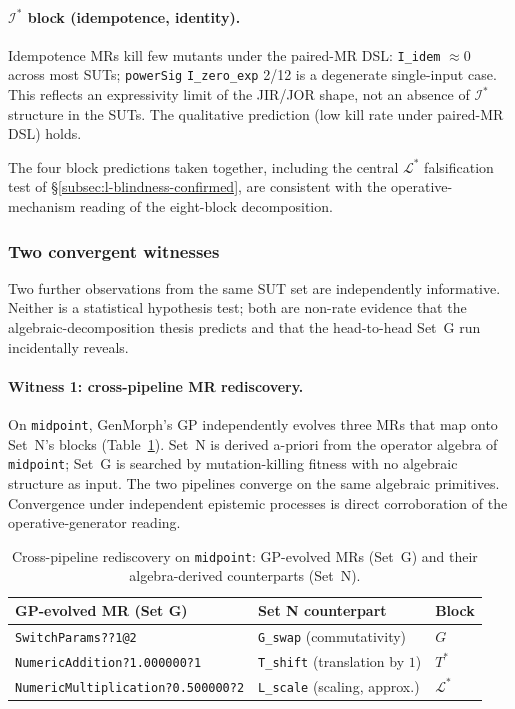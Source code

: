 \documentclass[acmsmall, screen]{acmart}
\begin{document}
\paragraph{$\mathcal{I}^{*}$ block (idempotence, identity).}
Idempotence MRs kill few mutants under the paired-MR DSL:
\texttt{I\_idem} $\approx 0$ across most SUTs; \texttt{powerSig}
\texttt{I\_zero\_exp} 2/12 is a degenerate single-input case. This
reflects an expressivity limit of the JIR/JOR shape, not an absence
of $\mathcal{I}^{*}$ structure in the SUTs. The qualitative
prediction (low kill rate under paired-MR DSL) holds.

The four block predictions taken together, including the central
$\mathcal{L}^{*}$ falsification test of
\S\ref{subsec:l-blindness-confirmed}, are consistent with the
operative-mechanism reading of the eight-block decomposition.

\subsubsection{Two convergent witnesses}
\label{subsec:convergent-witnesses}

Two further observations from the same SUT set are independently
informative. Neither is a statistical hypothesis test; both are
non-rate evidence that the algebraic-decomposition thesis predicts
and that the head-to-head Set~G run incidentally reveals.

\paragraph{Witness 1: cross-pipeline MR rediscovery.}
On \texttt{midpoint}, GenMorph's GP independently evolves three MRs
that map onto Set~N's blocks (Table~\ref{tab:rediscovery}). Set~N is
derived a-priori from the operator algebra of \texttt{midpoint};
Set~G is searched by mutation-killing fitness with no algebraic
structure as input. The two pipelines converge on the same algebraic
primitives. Convergence under independent epistemic processes is
direct corroboration of the operative-generator reading.

\begin{table}[h]
\centering
\caption{Cross-pipeline rediscovery on \texttt{midpoint}: GP-evolved
MRs (Set~G) and their algebra-derived counterparts (Set~N).}
\label{tab:rediscovery}
\small
\begin{tabular}{lll}
\toprule
GP-evolved MR (Set G) & Set N counterpart & Block \\
\midrule
\texttt{SwitchParams??1@2}                & \texttt{G\_swap} (commutativity)         & $G$ \\
\texttt{NumericAddition?1.000000?1}       & \texttt{T\_shift} (translation by $1$)   & $T^{*}$ \\
\texttt{NumericMultiplication?0.500000?2} & \texttt{L\_scale} (scaling, approx.)     & $\mathcal{L}^{*}$ \\
\bottomrule
\end{tabular}
\end{table}
\end{document}
